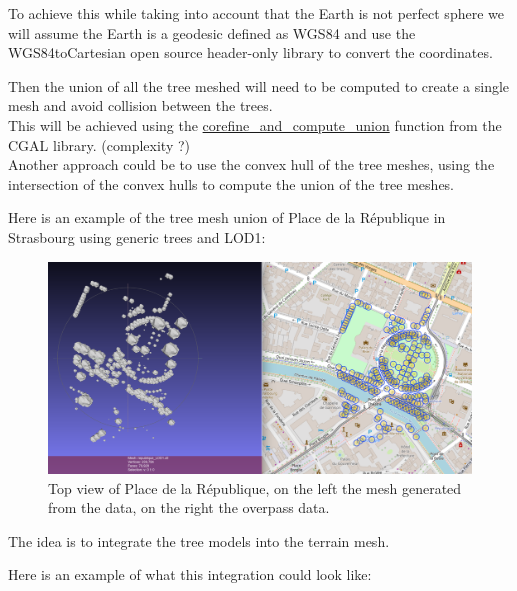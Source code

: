 \documentclass[12pt]{article}
\begin{document}
To achieve this while taking into account that the Earth is not perfect sphere
we will assume the Earth is a geodesic defined as WGS84 \cite{wgs84} and use 
the WGS84toCartesian\cite{wgs84_to_cartesian} open source header-only
library to convert the coordinates.

Then the union of all the tree meshed will need to be computed to create a single mesh
and avoid collision between the trees. \\
This will be achieved using the \href{https://doc.cgal.org/latest/Polygon_mesh_processing/group__PMP__corefinement__grp.html}{corefine\_and\_compute\_union} function from the CGAL library.
(complexity ?) \\
Another approach could be to use the convex hull of the tree meshes, using the
intersection of the convex hulls to compute the union of the tree meshes.

Here is an example of the tree mesh union of Place de la République in Strasbourg
using generic trees and LOD1:

\begin{figure}[H]
    \centering
        \centering
        \includegraphics[width=\textwidth]{images/mesh_vs_overpass.png}
        \caption{Top view of Place de la République, on the left the mesh generated from the data,
        on the right the overpass data.}

\end{figure}


The idea is to integrate the tree models into the terrain mesh.

Here is an example of what this integration could look like:
\end{document}

